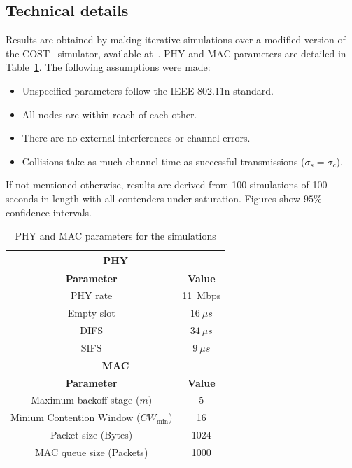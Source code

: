 \documentclass[a4paper,journal]{IEEEtran}
\begin{document}
	\subsection{Technical details}
	Results are obtained by making iterative simulations over a modified version of the COST~\cite{COST} simulator, available at~\cite{sim:parameters}. PHY and MAC parameters are detailed in Table~\ref{tab:mac-params}. The following assumptions were made:
	
	\begin{itemize}
		\item Unspecified parameters follow the IEEE 802.11n standard.
		\item All nodes are within reach of each other.
		\item There are no external interferences or channel errors.
		\item Collisions take as much channel time as successful transmissions ($\sigma_{s}=\sigma_{c}$).
	\end{itemize}
	
	If not mentioned otherwise, results are derived from 100 simulations of 100 seconds in length with all contenders under saturation. Figures show $95$\% confidence intervals.
	
	\begin{table}
		\centering
		\caption{PHY and MAC parameters for the simulations}
		\label{tab:mac-params}
		\begin{tabular}{|c|c|}
			\hline
			\multicolumn{2}{|c|}{{\bfseries PHY}}\\
			\hline
			{\bfseries Parameter} & {\bfseries Value}\\
			\hline
			PHY rate & 11~Mbps\\
			Empty slot & $16~\mu s$\\
			DIFS & $34~\mu s$\\
			SIFS & $9~\mu s$\\
			\hline
			\multicolumn{2}{|c|}{{\bfseries MAC}}\\
			\hline
			{\bfseries Parameter} & {\bfseries Value}\\
			\hline
			Maximum backoff stage ($m$) & 5\\
			Minium Contention Window ($CW_{\min}$) & 16\\
			Packet size (Bytes) & 1024\\
			MAC queue size (Packets) & 1000\\
			\hline
		\end{tabular}
	\end{table}
	
\end{document}

